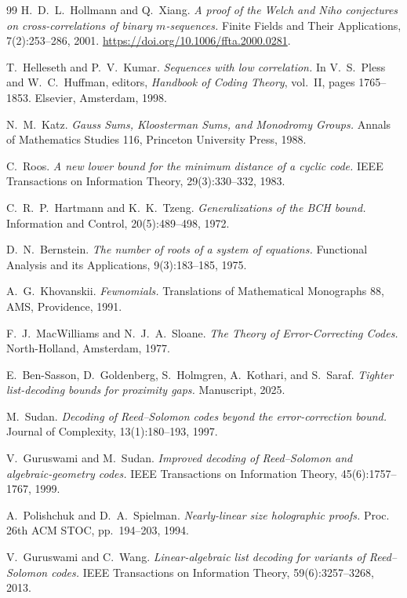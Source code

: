 \documentclass[11pt]{article}
\theoremstyle{definition}
\theoremstyle{remark}
\begin{document}
\begin{thebibliography}{99}
H.~D.~L.~Hollmann and Q.~Xiang.
\emph{A proof of the Welch and Niho conjectures on cross-correlations
of binary $m$-sequences.}
Finite Fields and Their Applications, 7(2):253--286, 2001.
\url{https://doi.org/10.1006/ffta.2000.0281}.

T.~Helleseth and P.~V.~Kumar.
\emph{Sequences with low correlation.}
In V.~S.~Pless and W.~C.~Huffman, editors,
\emph{Handbook of Coding Theory}, vol.~II, pages 1765--1853.
Elsevier, Amsterdam, 1998.

N.~M.~Katz.
\emph{Gauss Sums, Kloosterman Sums, and Monodromy Groups.}
Annals of Mathematics Studies 116, Princeton University Press, 1988.

C.~Roos.
\emph{A new lower bound for the minimum distance of a cyclic code.}
IEEE Transactions on Information Theory, 29(3):330--332, 1983.

C.~R.~P.~Hartmann and K.~K.~Tzeng.
\emph{Generalizations of the BCH bound.}
Information and Control, 20(5):489--498, 1972.

D.~N.~Bernstein.
\emph{The number of roots of a system of equations.}
Functional Analysis and its Applications, 9(3):183--185, 1975.

A.~G.~Khovanskii.
\emph{Fewnomials.}
Translations of Mathematical Monographs 88, AMS, Providence, 1991.

F.~J.~MacWilliams and N.~J.~A.~Sloane.
\emph{The Theory of Error-Correcting Codes.}
North-Holland, Amsterdam, 1977.

E.~Ben-Sasson, D.~Goldenberg, S.~Holmgren, A.~Kothari, and S.~Saraf.
\emph{Tighter list-decoding bounds for proximity gaps.}
Manuscript, 2025.

M.~Sudan.
\emph{Decoding of Reed--Solomon codes beyond the error-correction bound.}
Journal of Complexity, 13(1):180--193, 1997.

V.~Guruswami and M.~Sudan.
\emph{Improved decoding of Reed--Solomon and algebraic-geometry codes.}
IEEE Transactions on Information Theory, 45(6):1757--1767, 1999.

A.~Polishchuk and D.~A.~Spielman.
\emph{Nearly-linear size holographic proofs.}
Proc. 26th ACM STOC, pp.~194--203, 1994.

V.~Guruswami and C.~Wang.
\emph{Linear-algebraic list decoding for variants of Reed--Solomon codes.}
IEEE Transactions on Information Theory, 59(6):3257--3268, 2013.


\end{thebibliography}
\end{document}
